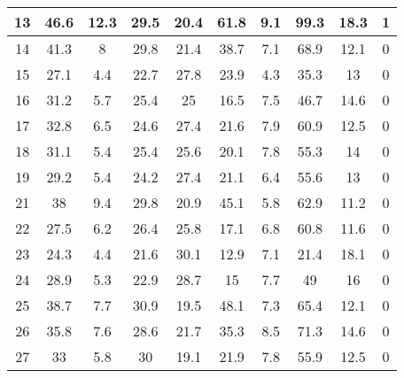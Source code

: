 \begin{longtable} {|c|c|c|c|c|c|c|c|c|c|}
13                            &        46.6&        12.3&        29.5&        20.4&        61.8&         9.1&        99.3&        18.3&           1\\\hline
14                            &        41.3&           8&        29.8&        21.4&        38.7&         7.1&        68.9&        12.1&           0\\\hline
15                            &        27.1&         4.4&        22.7&        27.8&        23.9&         4.3&        35.3&          13&           0\\\hline
16                            &        31.2&         5.7&        25.4&          25&        16.5&         7.5&        46.7&        14.6&           0\\\hline
17                            &        32.8&         6.5&        24.6&        27.4&        21.6&         7.9&        60.9&        12.5&           0\\\hline
18                            &        31.1&         5.4&        25.4&        25.6&        20.1&         7.8&        55.3&          14&           0\\\hline
19                            &        29.2&         5.4&        24.2&        27.4&        21.1&         6.4&        55.6&          13&           0\\\hline
21                            &          38&         9.4&        29.8&        20.9&        45.1&         5.8&        62.9&        11.2&           0\\\hline
22                            &        27.5&         6.2&        26.4&        25.8&        17.1&         6.8&        60.8&        11.6&           0\\\hline
23                            &        24.3&         4.4&        21.6&        30.1&        12.9&         7.1&        21.4&        18.1&           0\\\hline
24                            &        28.9&         5.3&        22.9&        28.7&          15&         7.7&          49&          16&           0\\\hline
25                            &        38.7&         7.7&        30.9&        19.5&        48.1&         7.3&        65.4&        12.1&           0\\\hline
26                            &        35.8&         7.6&        28.6&        21.7&        35.3&         8.5&        71.3&        14.6&           0\\\hline
27                            &          33&         5.8&          30&        19.1&        21.9&         7.8&        55.9&        12.5&           0\\\hline

\end{longtable}
